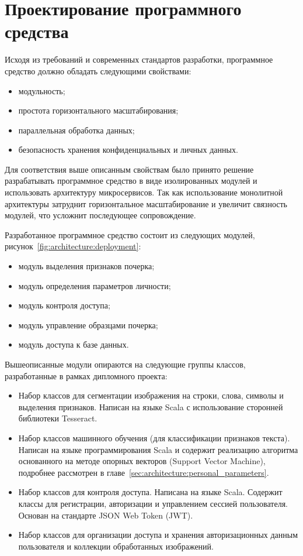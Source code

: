 \section{Проектирование программного средства}

Исходя из требований и современных стандартов разработки, программное средство должно обладать следующими свойствами:
\begin{itemize}
    \item модульность;
    \item простота горизонтального масштабирования;
    \item параллельная обработка данных;
    \item безопасность хранения конфиденциальных и личных данных.
\end{itemize}

Для соответствия выше описанным свойствам было принято решение разрабатывать программное средство в виде изолированных модулей и использовать архитектуру микросервисов. Так как использование монолитной архитектуры затруднит горизонтальное масштабирование и увеличит связность модулей, что усложнит последующее сопровождение. 

Разработанное программное средство состоит из следующих модулей, рисунок~\ref{fig:architecture:deployment}:
\begin{itemize}
    \item модуль выделения признаков почерка;
    \item модуль определения параметров личности;
    \item модуль контроля доступа;
    \item модуль управление образцами почерка;
    \item модуль доступа к базе данных.
\end{itemize}

Вышеописанные модули опираются на следующие группы классов, разработанные в рамках дипломного проекта:
\begin{itemize}
    \item Набор классов для сегментации изображения на строки, слова, символы и выделения признаков. Написан на языке Scala с использование сторонней библиотеки Tesseract.
    \item Набор классов машинного обучения (для классификации признаков текста). Написан на языке программирования Scala и содержит реализацию алгоритма основанного на методе опорных векторов (Support Vector Machine), подробнее рассмотрен в главе~\ref{sec:architecture:personal_parameters}.
    \item Набор классов для контроля доступа. Написана на языке Scala. Содержит классы для регистрации, авторизации и управлением сессией пользователя. Основан на стандарте JSON Web Token (JWT).
    \item Набор классов для организации доступа и хранения авторизационных данным пользователя и коллекции обработанных изображений.
\end{itemize}

